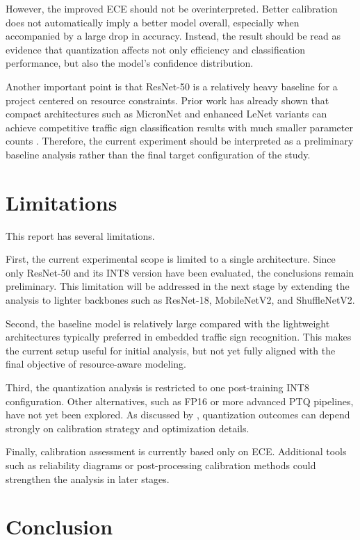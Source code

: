 \documentclass{article} %
\begin{document}
However, the improved ECE should not be overinterpreted. Better calibration does not automatically imply a better model overall, especially when accompanied by a large drop in accuracy. Instead, the result should be read as evidence that quantization affects not only efficiency and classification performance, but also the model's confidence distribution.

Another important point is that ResNet-50 is a relatively heavy baseline for a project centered on resource constraints. Prior work has already shown that compact architectures such as MicronNet and enhanced LeNet variants can achieve competitive traffic sign classification results with much smaller parameter counts \citep{wong2018micronnet,zaibi2021lenet}. Therefore, the current experiment should be interpreted as a preliminary baseline analysis rather than the final target configuration of the study.

\section{Limitations}

This report has several limitations.

First, the current experimental scope is limited to a single architecture. Since only ResNet-50 and its INT8 version have been evaluated, the conclusions remain preliminary. This limitation will be addressed in the next stage by extending the analysis to lighter backbones such as ResNet-18, MobileNetV2, and ShuffleNetV2.

Second, the baseline model is relatively large compared with the lightweight architectures typically preferred in embedded traffic sign recognition. This makes the current setup useful for initial analysis, but not yet fully aligned with the final objective of resource-aware modeling.

Third, the quantization analysis is restricted to one post-training INT8 configuration. Other alternatives, such as FP16 or more advanced PTQ pipelines, have not yet been explored. As discussed by \citet{hubara2021ptq}, quantization outcomes can depend strongly on calibration strategy and optimization details.

Finally, calibration assessment is currently based only on ECE. Additional tools such as reliability diagrams or post-processing calibration methods could strengthen the analysis in later stages.

\section{Conclusion}
\end{document}
